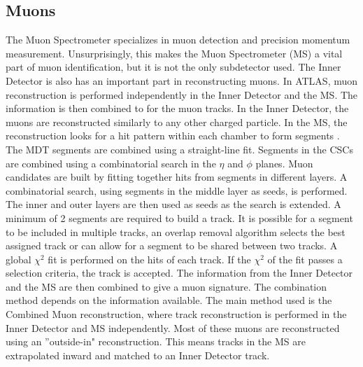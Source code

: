 \subsection{Muons}
The Muon Spectrometer specializes in muon detection and precision momentum measurement. Unsurprisingly, this makes the Muon Spectrometer (MS) a vital part of muon identification, but it is not the only subdetector used. The Inner Detector is also has an important part in reconstructing muons. In ATLAS, muon reconstruction is performed independently in the Inner Detector and the MS. The information is then combined to for the muon tracks. In the Inner Detector, the muons are reconstructed similarly to any other charged particle.\newline
\indent In the MS, the reconstruction looks for a hit pattern within each chamber to form segments \cite{Aad:2016jkr}. The MDT segments are combined using a straight-line fit. Segments in the CSCs are combined using a combinatorial search in the ${\eta}$ and ${\phi}$ planes. \newline
\indent Muon candidates are built by fitting together hits from segments in different layers. A combinatorial search, using segments in the middle layer as seeds, is performed. The inner and outer layers are then used as seeds as the search is extended. A minimum of 2 segments are required to build a track. It is possible for a segment to be included in multiple tracks, an overlap removal algorithm selects the best assigned track or can allow for a segment to be shared between two tracks. A global ${\chi^{2}}$ fit is performed on the hits of each track. If the ${\chi^{2}}$ of the fit passes a selection criteria, the track is accepted.\newline
\indent The information from the Inner Detector and the MS are then combined to give a muon signature. The combination method depends on the information available. The main method used is the Combined Muon reconstruction, where track reconstruction is performed in the Inner Detector and MS independently. Most of these muons are reconstructed using an ''outside-in" reconstruction. This  means tracks in the MS are extrapolated inward and matched to an Inner Detector track. \newline
